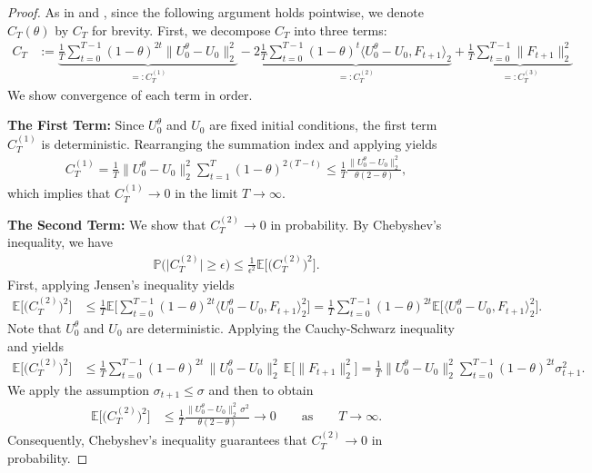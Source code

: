 \documentclass[a4paper, 11pt]{article}
\newcommand{\E}{\mathbb E}
\theoremstyle{definition}
\begin{document}
\begin{proof}
    As in  and , since the following argument holds pointwise, we denote $C_T(\theta)$ by $C_T$ for brevity.
    First, we decompose $C_T$ into three terms:
    \begin{align}
      C_T & := \underbrace{ \frac{1}{T} \sum_{t=0}^{T-1} (1-\theta)^{2t} \| U_0^\theta - U_0 \|^2_2 }_{ =: C_T^{(1)} } - 2 \underbrace{ \frac{1}{T} \sum_{t=0}^{T-1}(1-\theta)^t \big\langle U_{0}^\theta - U_0,  F_{t+1}\big\rangle_2 }_{ =: C_T^{(2)} } + \underbrace{ \frac{1}{T} \sum_{t=0}^{T-1} \|F_{t+1}\|^2_2 }_{ =: C_T^{(3)} }
    \end{align}
    We show convergence of each term in order.

    \vspace{5pt}
    \noindent
    \textbf{The First Term:}
    Since $U_0^\theta$ and $U_0$ are fixed initial conditions, the first term $C_T^{(1)}$ is deterministic.
    Rearranging the summation index and applying  yields
    \begin{align}
		C_T^{(1)} = \frac{1}{T} \| U_0^\theta - U_0 \|^2_2 \sum_{t=1}^{T} (1-\theta)^{2(T-t)} \le \frac{1}{T} \frac{\| U_0^\theta - U_0 \|^2_2}{\theta (2 - \theta)} ,
	\end{align}
    which implies that $C_T^{(1)} \to 0$ in the limit $T \to \infty$.

    \vspace{5pt}
    \noindent
    \textbf{The Second Term:}    
    We show that $C_T^{(2)} \to 0$ in probability.
    By Chebyshev’s inequality, we have
    \begin{align}
        \mathbb{P}\big( \big| C_T^{(2)} \big| \ge \epsilon \big) \le \frac{1}{\epsilon^2} \E\big[ \big( C_T^{(2)} \big)^2 \big] .
	\end{align}
    First, applying Jensen's inequality yields
    \begin{align}
		\E\big[ \big( C_T^{(2)} \big)^2 \big] & \leq \frac{1}{T} \E\bigg[ \sum_{t=0}^{T-1} (1-\theta)^{2t} \langle U_0^\theta - U_0, F_{t+1} \big\rangle_2^2 \bigg] = \frac{1}{T} \sum_{t=0}^{T-1} (1-\theta)^{2t} \E\big[ \langle U_0^\theta - U_0, F_{t+1} \big\rangle_2^2 \big] .
	\end{align}
    Note that $U_0^\theta$ and $U_0$ are deterministic.
    Applying the Cauchy-Schwarz inequality and  yields
    \begin{align}
		\E\big[ \big( C_T^{(2)} \big)^2 \big] & \le \frac{1}{T} \sum_{t=0}^{T-1} (1-\theta)^{2t} \, \| U_0^\theta - U_0 \|_2^2 \, \E\big[ \| F_{t+1} \|_2^2 \big] = \frac{1}{T} \| U_0^\theta - U_0 \|_2^2 \sum_{t=0}^{T-1} (1-\theta)^{2t} \sigma_{t+1}^2 .
	\end{align}
    We apply the assumption $\sigma_{t+1} \le \sigma$ and then  to obtain
    \begin{align}
		\E\big[ \big( C_T^{(2)} \big)^2 \big] & \le \frac{1}{T} \frac{\| U_0^\theta - U_0 \|_2^2 \, \sigma^2}{\theta (2 - \theta)} \longrightarrow 0 \qquad \text{as} \qquad T \longrightarrow \infty .
	\end{align}
    Consequently, Chebyshev's inequality guarantees that $C_T^{(2)} \to 0$ in probability. 
    

\end{proof}
\end{document}
